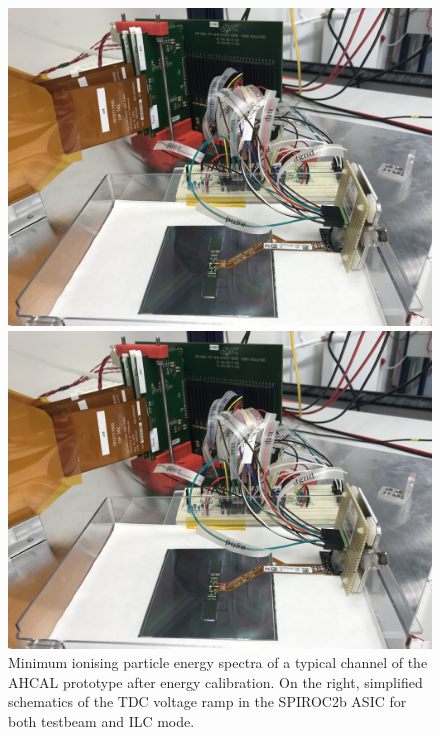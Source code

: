\begin{figure}[!ht]%
\centering
\vspace{-80px}
\hspace{-80px}
\parbox{1.2in}{
\includegraphics[width=2.5\linewidth]{pics/hist1.jpg}
}%
\hspace{150px}
\begin{minipage}{1.2in}%
\includegraphics[width=1.4\linewidth]{pics/hist1.jpg}
\end{minipage}%
\vspace{-80px}
\caption{Minimum ionising particle energy spectra of a typical channel of the AHCAL prototype after energy calibration. On the right, simplified schematics of the TDC voltage ramp in the SPIROC2b ASIC for both testbeam and ILC mode.}%
\label{fig:2figs}%
\end{figure}

